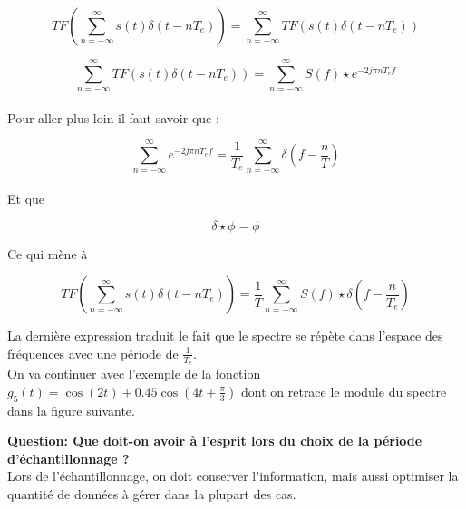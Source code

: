 \documentclass[11pt,a4paper]{article}
\begin{document}
\[ TF (\sum_{n = -\infty}^{\infty} s(t)\delta(t-nT_e)) = \sum_{n = -\infty}^{\infty} TF(s(t)\delta(t-nT_e) ) \]

\[ \sum_{n = -\infty}^{\infty} TF(s(t)\delta(t-nT_e) ) = \sum_{n = -\infty}^{\infty} S(f) \star e^{- 2j\pi n T_e f} \]\\

Pour aller plus loin il faut savoir que : 

\[ \sum_{n = -\infty}^{\infty} e^{- 2j\pi n T_e f} = \frac{1}{T_e} \sum_{n = -\infty}^{\infty} \delta(f - \frac{n}{T}) \]\\

Et que 

\[\delta \star \phi = \phi \]

Ce qui mène à 

\[ TF (\sum_{n = -\infty}^{\infty} s(t)\delta(t-nT_e)) = \frac{1}{T}\sum_{n = -\infty}^{\infty} S(f) \star \delta(f - \frac{n}{T_e})\]

La dernière expression traduit le fait que le spectre se répète dans l'espace des fréquences avec une période de $\frac{1}{T_e}$.\\

On va continuer avec l'exemple de la fonction $ g_5(t) = \cos(2 t) + 0.45 \cos(4 t + \frac{\pi}{3})$ dont on retrace le module du spectre dans  la figure suivante.

\begin{center}
\end{center}

\textbf{Question: Que doit-on avoir à l'esprit  lors du choix de la période d’échantillonnage ?}\\

Lors de l'échantillonnage, on doit conserver l'information, mais aussi optimiser la quantité de données à gérer dans la plupart des cas.\\
\end{document}
